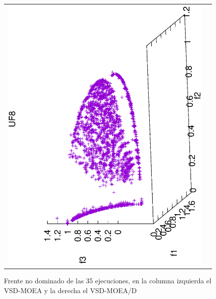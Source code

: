 \begin{figure}[H]
\centering
\scriptsize
\caption{Frente no dominado de las 35 ejecuciones, en la columna izquierda el VSD-MOEA y la derecha el VSD-MOEA/D}%
\begin{tabular}{cc}
 \includegraphics[scale=0.3, angle=-90,origin=c]{Figures_Chapter7/Results_Chapter4/Summary_Representative/VSD-MOEA/UF8.eps} &

\end{tabular}
\end{figure}
